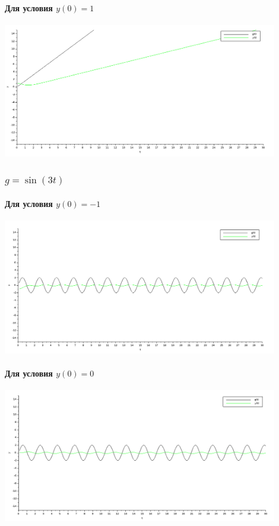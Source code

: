 \documentclass[12pt, a4paper] {ncc}
\begin{document}
\paragraph{Для условия $y(0) = 1$}
\begin{center}
\includegraphics[width=0.9\textwidth]{2g1.png}
\end{center}

\subsubsection{$g = \sin(3t)$}

\paragraph{Для условия $y(0) = -1$}
\begin{center}
\includegraphics[width=0.9\textwidth]{3g-1.png}
\end{center}

\paragraph{Для условия $y(0) = 0$}
\begin{center}
\includegraphics[width=0.9\textwidth]{3g0.png}
\end{center}
\end{document}
